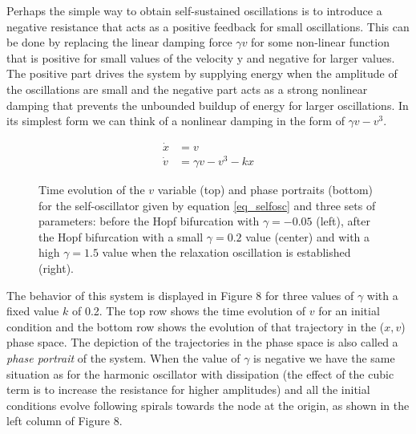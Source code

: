 \documentclass{article}
\begin{document}
Perhaps the simple way to obtain self-sustained oscillations is to introduce a negative resistance that acts as a positive feedback for small oscillations.
This can be done by replacing the linear damping force $\gamma v$ for some non-linear function that is positive for small values of the velocity y and negative for larger values.
The positive part drives the system by supplying energy when the amplitude of the oscillations are small and the negative part acts as a strong nonlinear damping that prevents the unbounded buildup of energy for larger oscillations. 
In its simplest form we can think of a nonlinear damping in the form of $\gamma v - v ^ 3$.

\begin{subequations} \label{eq_selfosc}
\begin{align}
    \dot{x} & = v \\
    \dot{v} & = \gamma v - v^3 -kx 
\end{align}
\end{subequations}


\begin{figure}
    \centering
    \caption{Time evolution of the $v$ variable (top) and phase portraits (bottom) for the self-oscillator given by equation \ref{eq_selfosc} and three sets of parameters: before the Hopf bifurcation with $\gamma=-0.05$ (left), after the Hopf bifurcation with a small $\gamma=0.2$ value (center) and with a high $\gamma=1.5$ value when the relaxation oscillation is established (right).} 
    \label{fig_selfosc}
\end{figure}

The behavior of this system is displayed in Figure 8 for three values of $\gamma$ with a fixed value $k$ of 0.2. 
The top row shows the time evolution of $v$ for an initial condition and the bottom row shows the evolution of that trajectory in the ($x,v$) phase space.
The depiction of the trajectories in the phase space is also called a {\em phase portrait} of the system.
When the value of $\gamma$ is negative we have the same situation as for the harmonic oscillator with dissipation (the effect of the cubic term is to increase the resistance for higher amplitudes) and all the initial conditions evolve following spirals towards the node at the origin, as shown in the left column of Figure 8. 
\end{document}
